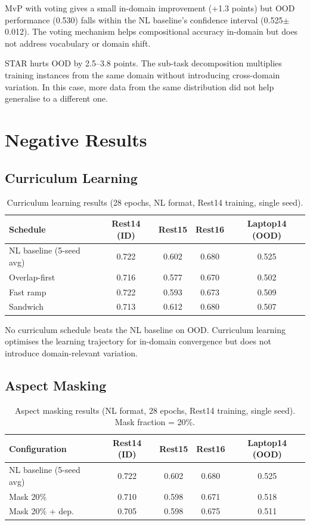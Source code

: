 \documentclass[12pt,a4paper]{report}
\begin{document}
MvP with voting gives a small in-domain improvement (+1.3 points) but OOD performance (0.530) falls within the NL baseline's confidence interval (0.525$\pm$0.012). The voting mechanism helps compositional accuracy in-domain but does not address vocabulary or domain shift.

STAR hurts OOD by 2.5--3.8 points. The sub-task decomposition multiplies training instances from the same domain without introducing cross-domain variation. In this case, more data from the same distribution did not help generalise to a different one.


\section{Negative Results}\label{sec:negative}

\subsection{Curriculum Learning}

\begin{table}[H]
\centering
\caption{Curriculum learning results (28 epochs, NL format, Rest14 training, single seed).}
\label{tab:curriculum}
\small
\begin{tabular}{@{}lcccc@{}}
\toprule
\textbf{Schedule} & \textbf{Rest14 (ID)} & \textbf{Rest15} & \textbf{Rest16} & \textbf{Laptop14 (OOD)} \\
\midrule
NL baseline (5-seed avg) & 0.722 & 0.602 & 0.680 & 0.525 \\
\midrule
Overlap-first & 0.716 & 0.577 & 0.670 & 0.502 \\
Fast ramp & 0.722 & 0.593 & 0.673 & 0.509 \\
Sandwich & 0.713 & 0.612 & 0.680 & 0.507 \\
\bottomrule
\end{tabular}
\end{table}

No curriculum schedule beats the NL baseline on OOD. Curriculum learning optimises the learning trajectory for in-domain convergence but does not introduce domain-relevant variation.

\subsection{Aspect Masking}

\begin{table}[H]
\centering
\caption{Aspect masking results (NL format, 28 epochs, Rest14 training, single seed). Mask fraction = 20\%.}
\label{tab:masking}
\small
\begin{tabular}{@{}lcccc@{}}
\toprule
\textbf{Configuration} & \textbf{Rest14 (ID)} & \textbf{Rest15} & \textbf{Rest16} & \textbf{Laptop14 (OOD)} \\
\midrule
NL baseline (5-seed avg) & 0.722 & 0.602 & 0.680 & 0.525 \\
\midrule
Mask 20\% & 0.710 & 0.598 & 0.671 & 0.518 \\
Mask 20\% + dep. & 0.705 & 0.598 & 0.675 & 0.511 \\
\bottomrule
\end{tabular}
\end{table}
\end{document}
